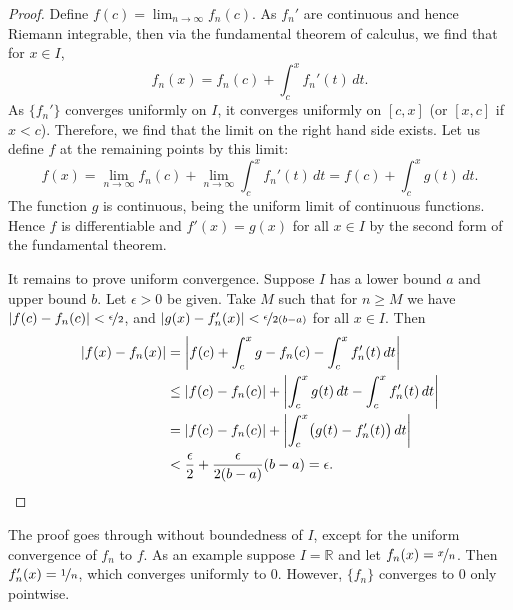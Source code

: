 \documentclass[12pt,openany]{book}
\newcommand{\abs}[1]{\left\lvert {#1} \right\rvert}
\newcommand{\R}{{\mathbb{R}}}
\theoremstyle{plain}
\theoremstyle{remark}
\theoremstyle{definition}
\theoremstyle{exercise}
\theoremstyle{example}
\begin{document}
\begin{proof}
Define $f(c) = \lim_{n\to \infty} f_n(c)$.
As $f_n'$ are continuous and hence Riemann integrable,
then
via the fundamental theorem of calculus, we find that for $x \in I$,
\begin{equation*}
f_n(x) = f_n(c) + \int_c^x f_n' (t)\, dt.
\end{equation*}
As $\{ f_n' \}$ converges uniformly on $I$, it converges uniformly
on $[c,x]$ (or $[x,c]$ if $x < c$).
Therefore, we find that the limit on the right hand side exists.
Let us define $f$ at the remaining points by this limit:
\begin{equation*}
f(x) =
\lim_{n\to\infty} f_n(c) + \lim_{n\to\infty} \int_c^x f_n' (t)\, dt
=
f(c) + \int_c^x g(t)\,dt .
\end{equation*}
The function $g$ is continuous, being the uniform limit of continuous
functions.  Hence $f$ is differentiable and $f'(x) = g(x)$ for all $x \in I$
by the second form of the fundamental theorem.

It remains to prove
uniform convergence.
Suppose $I$ has a lower bound $a$ and upper bound $b$.
Let $\epsilon > 0$ be given.  Take $M$
such that for $n \geq M$ we have
$\abs{f(c)-f_n(c)} < \nicefrac{\epsilon}{2}$,
and
$\abs{g(x)-f_n'(x)} < \nicefrac{\epsilon}{2(b-a)}$
for all $x \in I$.  Then
\begin{equation*}
\begin{split}
\abs{f(x) - f_n(x)} & =
\abs{f(c) + \int_c^x g - f_n(c) - \int_c^x f_n'(t)\,dt}
\\
& \leq
\abs{f(c) - f_n(c)} + \abs{\int_c^x g(t)\,dt - \int_c^x f_n'(t)\,dt}
\\
& =
\abs{f(c) - f_n(c)} + \abs{\int_c^x \bigl(g(t) - f_n'(t)\bigr) \, dt}
\\
& <
\frac{\epsilon}{2}
+
\frac{\epsilon}{2(b-a)}
(b-a)
=\epsilon. \qedhere
\end{split}
\end{equation*}
\end{proof}

The proof goes through without boundedness of $I$, except for the
uniform convergence of $f_n$ to $f$.  As an example suppose $I = \R$ and let
$f_n(x) = \nicefrac{x}{n}$.  Then $f_n'(x)=\nicefrac{1}{n}$, which
converges uniformly to $0$.  However, $\{f_n\}$ converges to $0$ only pointwise.
\end{document}
